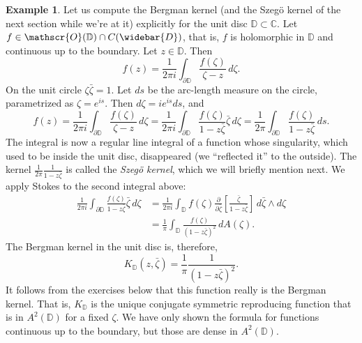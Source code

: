 \documentclass[12pt,openany]{book}
\newcommand{\C}{{\mathbb{C}}}
\newcommand{\D}{{\mathbb{D}}}
\newcommand{\sO}{{\mathscr{O}}}
\theoremstyle{plain}
\theoremstyle{remark}
\theoremstyle{definition}
\theoremstyle{exercise}
\theoremstyle{example}
\newtheorem{example}[thm]{Example}
\begin{document}
\begin{example} \label{example:bergmankerneldisc}
%
%
Let us compute the Bergman kernel (and
the Szeg{\"o} kernel of the next section while we're at it)
explicitly for the
unit disc $\D \subset \C$.  Let $f \in \sO(\D) \cap C(\widebar{D})$, that
is, $f$ is holomorphic in $\D$ and continuous up to the boundary.
Let $z \in \D$.
Then
\begin{equation*}
f(z) = \frac{1}{2\pi i} \int_{\partial \D} \frac{f(\zeta)}{\zeta-z} \,
d\zeta .
\end{equation*}
On the unit circle $\zeta \bar{\zeta} = 1$.  Let $ds$ be
the arc-length measure on the circle, parametrized as $\zeta =
e^{is}$.
Then $d\zeta = i e^{is} ds$, and 
\begin{equation*}
f(z) = \frac{1}{2\pi i} \int_{\partial \D} \frac{f(\zeta)}{\zeta-z} \,
d\zeta
= \frac{1}{2\pi i} \int_{\partial \D} \frac{f(\zeta)}{1-z\bar{\zeta}}
\bar{\zeta} \, d\zeta
= \frac{1}{2\pi} \int_{\partial \D} \frac{f(\zeta)}{1-z\bar{\zeta}} \, ds .
\end{equation*}
The integral is now a regular line integral of a function whose
singularity, which used to be inside the unit disc, disappeared (we 
``reflected it'' to the outside).  The kernel 
$\frac{1}{2\pi} \frac{1}{1-z\bar{\zeta}}$ is called the
\emph{Szeg{\"o} kernel}, which we
will briefly mention next.  We apply Stokes to the second integral above:
\begin{equation*}
\begin{split}
\frac{1}{2\pi i} \int_{\partial \D} \frac{f(\zeta)}{1-z\bar{\zeta}}
\bar{\zeta} \, d\zeta 
&=
\frac{1}{2\pi i} \int_{\D} f(\zeta)
\frac{\partial}{\partial \bar{\zeta}} \left[
\frac{\bar{\zeta}}{1-z\bar{\zeta}} \right] \,
d\bar{\zeta} \wedge d\zeta 
\\
&=
\frac{1}{\pi} \int_{\D} 
\frac{f(\zeta)}{{(1-z\bar{\zeta})}^2} \, dA(\zeta) .
\end{split}
\end{equation*}
The Bergman kernel in the unit disc is, therefore,
\begin{equation*}
K_{\D}(z,\bar{\zeta}) = \frac{1}{\pi} \frac{1}{{(1-z\bar{\zeta})}^2} .
\end{equation*}
It follows from the exercises below that
this function really is the Bergman kernel.
That is, $K_{\D}$ is the unique conjugate symmetric
reproducing function that is in
$A^2({\D})$ for a fixed $\zeta$.  
We have only shown the formula for functions continuous up to the boundary,
but those are dense in $A^2({\D})$.
\end{example}
\end{document}
